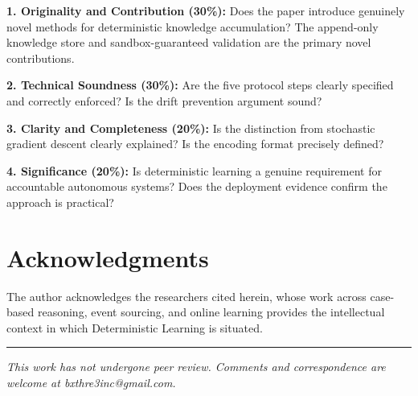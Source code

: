 \documentclass[12pt]{article}
\begin{document}
\textbf{1. Originality and Contribution (30\%):} Does the paper introduce genuinely novel methods for deterministic knowledge accumulation? The append-only knowledge store and sandbox-guaranteed validation are the primary novel contributions.

\textbf{2. Technical Soundness (30\%):} Are the five protocol steps clearly specified and correctly enforced? Is the drift prevention argument sound?

\textbf{3. Clarity and Completeness (20\%):} Is the distinction from stochastic gradient descent clearly explained? Is the encoding format precisely defined?

\textbf{4. Significance (20\%):} Is deterministic learning a genuine requirement for accountable autonomous systems? Does the deployment evidence confirm the approach is practical?

\section*{Acknowledgments}

The author acknowledges the researchers cited herein, whose work across case-based reasoning, event sourcing, and online learning provides the intellectual context in which Deterministic Learning is situated.




\vspace{2em}
\hrule
\vspace{0.5em}
\noindent\small\textit{This work has not undergone peer review. Comments and correspondence are welcome at bxthre3inc@gmail.com.}
\end{document}
